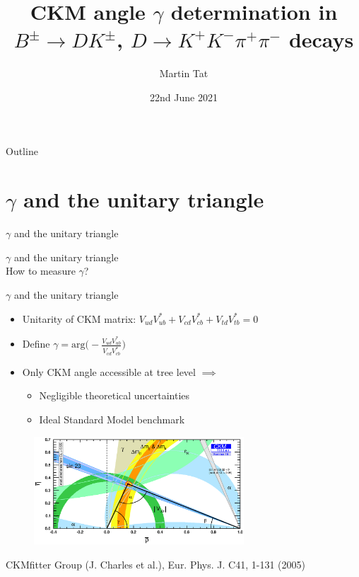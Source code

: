 \documentclass{beamer}
\title[$B^\pm\to(K^+K^-\pi^+\pi^-)_DK^\pm$]{CKM angle \texorpdfstring{$\gamma$}{gamma} determination in \texorpdfstring{$B^\pm\to DK^\pm$, $D\to K^+K^-\pi^+\pi^-$}{B to DK, D to K+K-pi+pi-} decays}
\author{Martin Tat}
\institute{Oxford LHCb}
\date{22nd June 2021}
\begin{document}
\begin{frame}
  \titlepage
\end{frame}

\begin{frame}{Outline}
  \tableofcontents
\end{frame}

\section{\texorpdfstring{$\gamma$}{gamma} and the unitary triangle}
\begin{frame}{$\gamma$ and the unitary triangle}
  \begin{center}
    {\huge $\gamma$ and the unitary triangle} \\
    \vspace{1cm}
    {\Large How to measure $\gamma$?}
  \end{center}
\end{frame}

\begin{frame}{$\gamma$ and the unitary triangle}
  \begin{itemize}
    \setlength\itemsep{1.0em}
    \item{Unitarity of CKM matrix: $V_{ud}V^*_{ub} + V_{cd}V^*_{cb} + V_{td}V^*_{tb} = 0$}
    \item{Define $\gamma = \text{arg}\Big(-\frac{V_{ud}V^*_{ub}}{V_{cd}V^*_{cb}}\Big)$}
    \item{Only CKM angle accessible at tree level $\implies$}
    \begin{itemize}
      \item{Negligible theoretical uncertainties}
      \item{Ideal Standard Model benchmark}
    \end{itemize}
  \end{itemize}
  \vspace{-0.2cm}
  \begin{figure}
    \includegraphics[width = 0.70\textwidth]{ckmfitter2.eps}
  \end{figure}
  \vspace{-0.7cm}
  \begin{center}
    CKMfitter Group (J. Charles et al.), Eur. Phys. J. C41, 1-131 (2005)
  \end{center}
\end{frame}
\end{document}
